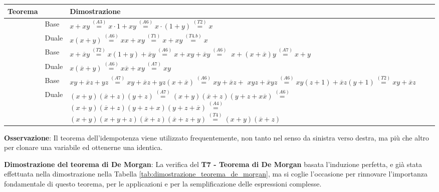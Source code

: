 \documentclass[a4paper]{extarticle}
\renewcommand\arraystretch{}
\begin{document}
\noindent
\renewcommand{\arraystretch}{1.5}
\begin{tabularx}{\textwidth}{>{\textwidth}P>{\textwidth}ll}
    \textbf{Teorema} & $ $ & \textbf{Dimostrazione} \\
    \hline
     & Base & $x + xy \overset{(A3)}{=} x \cdot 1 + xy \overset{(A6)}{=} x \cdot (1 + y) \overset{(T2)}{=} x$\\
    & Duale & $x (x + y) \overset{(A6)}{=} xx + xy \overset{(T1)}{=} x + xy \overset{(T4.b)}{=} x$\\
    \hline
     & Base & \parbox{\linewidth}{$x + \overline{x}y \overset{(T2)}{=} x (1 + y) + \overline{x}y \overset{(A6)}{=} x + xy + \overline{x}y \overset{(A6)}{=}$ \\ $x + (x + \overline{x})y \overset{(A7)}{=} x + y$}\\
    & Duale & $x(\overline{x} + y) \overset{(A6)}{=} x \overline{x} + xy \overset{(A7)}{=} xy$\\
    \hline
     & Base & \parbox{\linewidth}{$xy + \overline{x}z + yz \overset{(A7)}{=} xy + \overline{x}z + yz(x + \overline{x}) \overset{(A6)}{=} xy + \overline{x}z + $ \\ $ xyz + \overline{x}yz \overset{(A6)}{=} xy(z + 1) + \overline{x}z(y + 1) \overset{(T2)}{=} xy + \overline{x}z$}\\
    & Duale & \parbox{\linewidth}{$(x + y)(\overline{x} + z)(y + z) \overset{(A7)}{=} (x + y)(\overline{x} + z)(y + z + x \overline{x}) \overset{(A6)}{=}$ \\ $(x + y)(\overline{x} + z)(y + z + x)(y + z + \overline{x}) \overset{(A4)}{=}$ \\ $(x + y)(x + y + z)(\overline{x} + z)(\overline{x} + z + y) \overset{(T4)}{=} (x + y)(\overline{x} + z)$}\\
\end{tabularx}

\vspace{1em}
\noindent
\textbf{Osservazione}: Il teorema dell'idempotenza viene utilizzato frequentemente, non tanto nel senso da sinistra verso destra, ma più che altro per clonare una variabile ed ottenerne una identica.

\vspace{1em}
\noindent
\textbf{Dimostrazione del teorema di De Morgan}:
La verifica del \textbf{T7 - Teorema di De Morgan} basata l’induzione perfetta, e già stata effettuata nella dimostrazione nella Tabella \ref{tab:dimostrazione_teorema_de_morgan}, ma si coglie l'occasione per rinnovare l'importanza fondamentale di questo teorema, per le applicazioni e per la semplificazione delle espressioni complesse.
\end{document}
